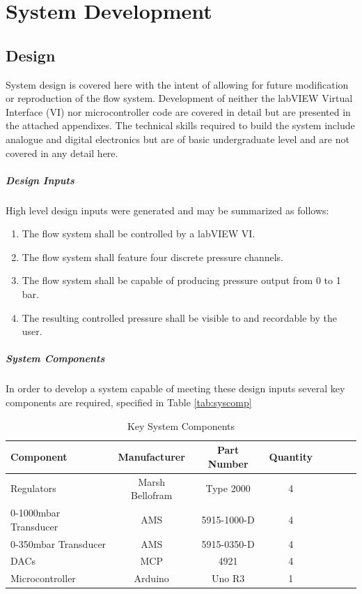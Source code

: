 \chapter{System Development}

\section{Design}

System design is covered here with the intent of allowing for future modification or reproduction of the flow system. Development of neither the labVIEW Virtual Interface (VI) nor microcontroller code are covered in detail but are presented in the attached appendixes. The technical skills required to build the system include analogue and digital electronics but are of basic undergraduate level and are not covered in any detail here. 

\qquad


\paragraph{Design Inputs} High level design inputs were generated and may be summarized as follows:


\begin{enumerate}
\item The flow system shall be controlled by a labVIEW VI.
\item The flow system shall feature four discrete pressure channels.
\item The flow system shall be capable of producing pressure output 
from 0 to 1 bar.
\item The resulting controlled pressure shall be visible to and recordable by the user.
\end{enumerate}

\clearpage

\paragraph{System Components}In order to develop a system capable of meeting these design inputs several key components are required, specified in Table \vref{tab:syscomp}

\qquad

 
\begin{table}[H]
\begin{center}
\begin{tabular}{l*{6}{c}r}
Component & Manufacturer & Part Number & Quantity \\
\hline
Regulators & Marsh Bellofram & Type 2000 & 4 \\
0-1000mbar Transducer & AMS & 5915-1000-D & 4\\
0-350mbar Transducer & AMS & 5915-0350-D & 4\\
DACs & MCP & 4921 & 4\\
Microcontroller & Arduino & Uno R3 & 1 \\
\end{tabular}
\caption [Key System Components]{Key System Components} 
\label{tab:syscomp}
\end{center}
\end{table}

